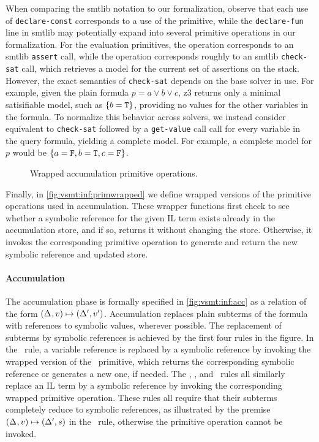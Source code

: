 When comparing the \acs{smtlib} notation to our formalization, observe that
each use of \lstinline{declare-const} corresponds to a use of the \pspawn{}
primitive, while the \lstinline{declare-fun} line in \acs{smtlib} may
potentially expand into several primitive operations in our formalization.
%
For the evaluation primitives, the \passert{} operation corresponds to an
\acs{smtlib} \lstinline{assert} call, while the \pmodel{} operation corresponds
roughly to an \acs{smtlib} \lstinline{check-sat} call, which retrieves a model
for the current set of assertions on the stack.
%
However, the exact semantics of \lstinline{check-sat} depends on the base
solver in use. For example, given the plain formula $p = a \vee b \vee c$, z3
returns only a minimal satisifiable model, such as $\{b = \texttt{T}{}\}$, providing
no values for the other variables in the formula.
%
To normalize this behavior across solvers, we instead consider \pmodel{}
equivalent to \lstinline{check-sat} followed by a \lstinline{get-value} call
call for every variable in the query formula, yielding a complete model. For
example, a complete model for $p$ would be $\set{a=\fls{}, b=\tru{},
c=\fls{}}$.


\begin{figure}
  
  \caption{Wrapped accumulation primitive operations.}
  \label{fig:vsmt:inf:primwrapped}
\end{figure}


Finally, in \autoref{fig:vsmt:inf:primwrapped} we define wrapped versions of the
primitive operations used in accumulation. These wrapper functions first check
to see whether a symbolic reference for the given IL term exists already in the
accumulation store, and if so, returns it without changing the store.
Otherwise, it invokes the corresponding primitive operation to generate and
return the new symbolic reference and updated store.


\paragraph{Accumulation}
%
The accumulation phase is formally specified in \autoref{fig:vsmt:inf:acc} as a
relation of the form $(\Delta_{},v)\mapsto{}(\Delta_{}',v')$.
%
Accumulation replaces plain subterms of the formula with references to symbolic
values, wherever possible. The replacement of subterms by symbolic references
is achieved by the first four rules in the figure. In the \acRef\ rule, a
variable reference is replaced by a symbolic reference by invoking the wrapped
version of the \pspawn\ primitive, which returns the corresponding symbolic
reference or generates a new one, if needed.
%
The \acNotS, \acAndS, and \acOrS\ rules all similarly replace an IL term by a
symbolic reference by invoking the corresponding wrapped primitive operation.
These rules all require that their subterms completely reduce to symbolic
references, as illustrated by the premise
$(\Delta_{},v)\mapsto{}(\Delta_{}',s)$ in the \acNotS\ rule, otherwise the
primitive operation cannot be invoked.


